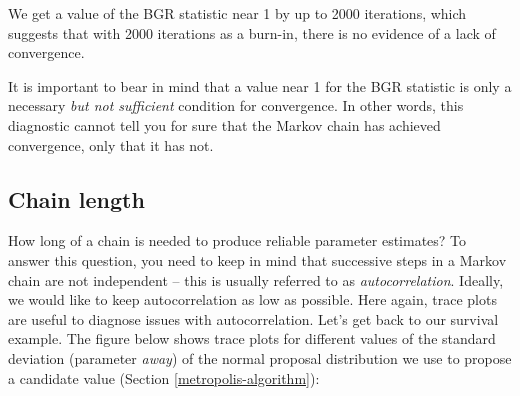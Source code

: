 \documentclass[
  12pt,
]{krantz}
\begin{document}
We get a value of the BGR statistic near 1 by up to 2000 iterations, which suggests that with 2000 iterations as a burn-in, there is no evidence of a lack of convergence.

It is important to bear in mind that a value near 1 for the BGR statistic is only a necessary \emph{but not sufficient} condition for convergence. In other words, this diagnostic cannot tell you for sure that the Markov chain has achieved convergence, only that it has not.

\subsection{Chain length}\label{chain-length}

How long of a chain is needed to produce reliable parameter estimates? To answer this question, you need to keep in mind that successive steps in a Markov chain are not independent -- this is usually referred to as \emph{autocorrelation}. Ideally, we would like to keep autocorrelation as low as possible. Here again, trace plots are useful to diagnose issues with autocorrelation. Let's get back to our survival example. The figure below shows trace plots for different values of the standard deviation (parameter \emph{away}) of the normal proposal distribution we use to propose a candidate value (Section \ref{metropolis-algorithm}):
\end{document}
